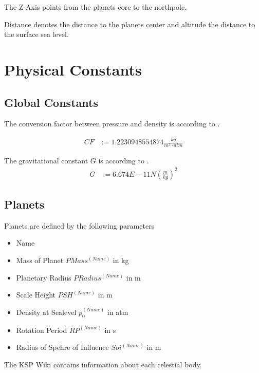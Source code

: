 \documentclass[11pt]{article}
\begin{document}
The Z-Axis points from the planets core to the northpole.

Distance denotes the distance to the planets center and altitude the
distance to the surface sea level.

\section{Physical Constants}


\subsection{Global Constants}

The  conversion factor between pressure and
density is according to \cite{Atmo}.

\begin{align}
  CF &:= 1.2230948554874 \frac{kg}{m^3\cdot atm}
\end{align}

The  gravitational constant $G$ is according to \cite{ACB}.
\begin{align}
  G &:= 6.674E-11 N\left(\frac{m}{kg}\right)^2
\end{align}

\subsection{Planets}

Planets are defined by the following parameters

\begin{itemize}
\item Name
\item {} Mass of Planet $PMass^{(Name)}$ in kg
\item {} Planetary Radius $PRadius^{(Name)}$ in m
\item {} Scale Height $PSH^{(Name)}$ in m
\item {} Density at Sealevel $p_0^{(Name)}$ in atm
\item {} Rotation Period $RP^{(Name)}$ in s
\item {} Radius of Spehre of Influence $Soi^{(Name)}$ in m
\end{itemize}

The KSP Wiki \cite{Wiki} contains information about each celestial body.
\end{document}
